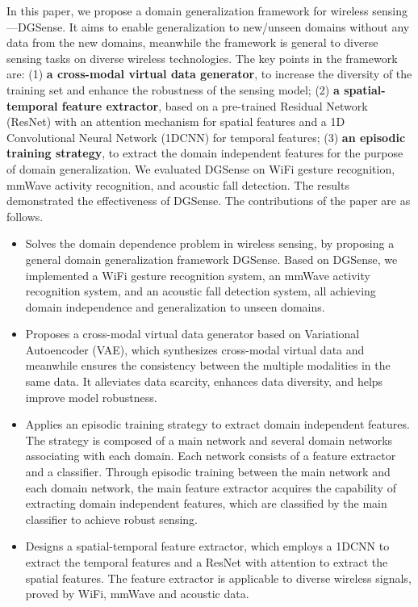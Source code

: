 \documentclass[journal]{IEEEtran}
\begin{document}
In this paper, we propose a domain generalization framework for wireless sensing---DGSense. It aims to enable generalization to new/unseen domains without any data from the new domains, meanwhile the framework is general to diverse sensing tasks on diverse wireless technologies. The key points in the framework are: (1) \textbf{a cross-modal virtual data generator}, to increase the diversity of the training set and enhance the robustness of the sensing model; (2) \textbf{a spatial-temporal feature extractor}, based on a pre-trained Residual Network (ResNet) with an attention mechanism for spatial features and a 1D Convolutional Neural Network (1DCNN) for temporal features; (3) \textbf{an episodic training strategy}, to extract the domain independent features for the purpose of domain generalization. We evaluated DGSense on WiFi gesture recognition, mmWave activity recognition, and acoustic fall detection. The results demonstrated the effectiveness of DGSense.
%
The contributions of the paper are as follows.
\begin{itemize} 
\item Solves the domain dependence problem in wireless sensing, by proposing a general domain generalization framework DGSense. Based on DGSense, we implemented a WiFi gesture recognition system, an mmWave activity recognition system, and an acoustic fall detection system, all achieving domain independence and generalization to unseen domains.
\item Proposes a cross-modal virtual data generator based on Variational Autoencoder (VAE), which synthesizes cross-modal virtual data and meanwhile ensures the consistency between the multiple modalities in the same data. It alleviates data scarcity, enhances data diversity, and helps improve model robustness. 
\item Applies an episodic training strategy to extract domain independent features. The strategy is composed of a main network and several domain networks associating with each domain. Each network consists of a feature extractor and a classifier. Through episodic training between the main network and each domain network, the main feature extractor acquires the capability of extracting domain independent features, which are classified by the main classifier to achieve robust sensing. 
\item Designs a spatial-temporal feature extractor, which employs a 1DCNN to extract the temporal features and a ResNet with attention to extract the spatial features. The feature extractor is applicable to diverse wireless signals, proved by WiFi, mmWave and acoustic data.
\end{itemize}
\end{document}
